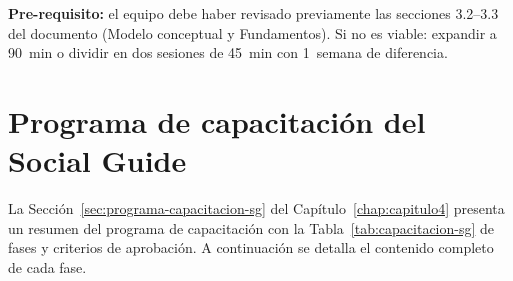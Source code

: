 \noindent\textbf{Pre-requisito:} el equipo debe haber revisado previamente las secciones 3.2--3.3 del documento (Modelo conceptual y Fundamentos). Si no es viable: expandir a 90~min o dividir en dos sesiones de 45~min con 1~semana de diferencia.

\section{Programa de capacitación del Social Guide}

La Sección~\ref{sec:programa-capacitacion-sg} del Capítulo~\ref{chap:capitulo4} presenta un resumen del programa de capacitación con la Tabla~\ref{tab:capacitacion-sg} de fases y criterios de aprobación. A continuación se detalla el contenido completo de cada fase.

\begingroup
\scriptsize
\renewcommand{\arraystretch}{1.3}
\setlength{\tabcolsep}{4pt}
\setlength{\LTleft}{0pt}
\setlength{\LTright}{0pt}

